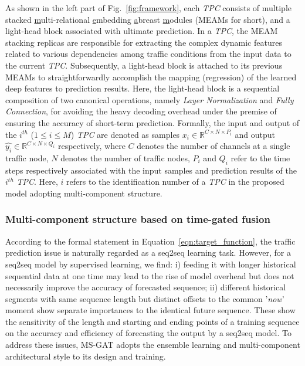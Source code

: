 As shown in the left part of Fig.~\ref{fig:framework}, each \textit{TPC} consists of multiple stacked \underline{m}ulti-relational \underline{e}mbedding \underline{a}breast \underline{m}odules (MEAMs for short), and a light-head block associated with ultimate prediction. In a \textit{TPC}, the MEAM stacking replicas are responsible for extracting the complex dynamic features related to various dependencies among traffic conditions from the input data to the current \textit{TPC}. Subsequently, a light-head block is attached to its previous MEAMs to straightforwardly accomplish the mapping (regression) of the learned deep features to prediction results. Here, the light-head block is a sequential composition of two canonical operations, namely \textit{Layer Normalization} and \textit{Fully Connection}, for avoiding the heavy decoding overhead under the premise of ensuring the accuracy of short-term prediction. Formally, the input and output of the $i^{th}$ ($1 \leq i \leq \mathit{M}$) \textit{TPC} are  denoted as samples $x_i \in \mathbb{R}^{C \times N \times P_i}$ and output $\hat{y_i} \in \mathbb{R}^{C \times N \times Q_i}$ respectively, where $C$ denotes the number of channels at a single traffic node, $N$ denotes the number of traffic nodes, $P_i$ and $Q_i$ refer to the time steps respectively associated with the input samples and prediction results of the $i^{th}$ \textit{TPC}. Here, $i$ refers to the identification number of a \textit{TPC} in the proposed model adopting multi-component structure.  

\subsubsection{Multi-component structure based on time-gated fusion}

According to the formal statement in Equation~\ref{eqn:target_function}, the traffic prediction issue is naturally regarded as a seq2seq learning task. However, for a seq2seq model by supervised learning, we find: i) feeding it with longer historical sequential data at one time may lead to the rise of model overhead but does not necessarily improve the accuracy of forecasted sequence; ii) different historical segments with same sequence length but distinct offsets to the common '\textit{now}' moment show separate importances to the identical future sequence. These show the sensitivity of the length and starting and ending points of a training sequence on the accuracy and efficiency of forecasting the output by a seq2seq model. To address these issues, MS-GAT adopts the ensemble learning and multi-component architectural style to its design and training.

